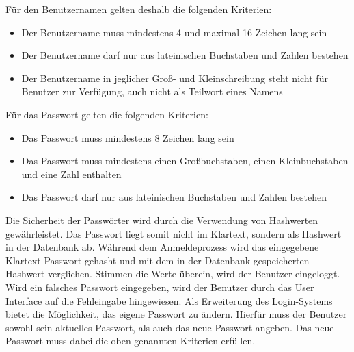 \noindent{}Für den Benutzernamen gelten deshalb die folgenden Kriterien:
\begin{itemize}
  \item Der Benutzername muss mindestens 4 und maximal 16 Zeichen lang sein
  \item Der Benutzername darf nur aus lateinischen Buchstaben und Zahlen bestehen
  \item Der Benutzername  in jeglicher Groß- und Kleinschreibung steht nicht für Benutzer zur Verfügung, auch nicht als Teilwort eines Namens
\end{itemize}
Für das Passwort gelten die folgenden Kriterien:
\begin{itemize}
  \item Das Passwort muss mindestens 8 Zeichen lang sein
  \item Das Passwort muss mindestens einen Großbuchstaben, einen Kleinbuchstaben und eine Zahl enthalten
  \item Das Passwort darf nur aus lateinischen Buchstaben und Zahlen bestehen
\end{itemize} 
\noindent
Die Sicherheit der Passwörter wird durch die Verwendung von Hashwerten gewährleistet.
Das Passwort liegt somit nicht im Klartext, sondern als Hashwert in der Datenbank ab.
Während dem Anmeldeprozess wird das eingegebene Klartext-Passwort gehasht und mit dem in der Datenbank gespeicherten Hashwert verglichen.
Stimmen die Werte überein, wird der Benutzer eingeloggt.
Wird ein falsches Passwort eingegeben, wird der Benutzer durch das User Interface auf die Fehleingabe hingewiesen.
\newparagraph
Als Erweiterung des Login-Systems bietet  die Möglichkeit, das eigene Passwort zu ändern.
Hierfür muss der Benutzer sowohl sein aktuelles Passwort, als auch das neue Passwort angeben.
Das neue Passwort muss dabei die oben genannten Kriterien erfüllen.

